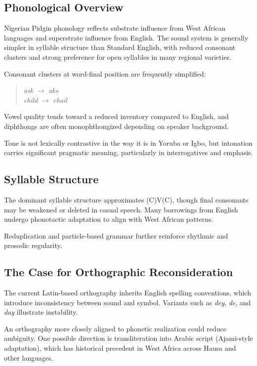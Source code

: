 \documentclass[12pt]{article}
\begin{document}
\subsection{Phonological Overview}

Nigerian Pidgin phonology reflects substrate influence from West African languages and superstrate influence from English. The sound system is generally simpler in syllable structure than Standard English, with reduced consonant clusters and strong preference for open syllables in many regional varieties.

Consonant clusters at word-final position are frequently simplified:

\begin{quote}
\textit{ask} $\rightarrow$ \textit{aks} \\
\textit{child} $\rightarrow$ \textit{chail}
\end{quote}

Vowel quality tends toward a reduced inventory compared to English, and diphthongs are often monophthongized depending on speaker background.

Tone is not lexically contrastive in the way it is in Yoruba or Igbo, but intonation carries significant pragmatic meaning, particularly in interrogatives and emphasis.

\subsection{Syllable Structure}

The dominant syllable structure approximates (C)V(C), though final consonants may be weakened or deleted in casual speech. Many borrowings from English undergo phonotactic adaptation to align with West African patterns.

Reduplication and particle-based grammar further reinforce rhythmic and prosodic regularity.

\subsection{The Case for Orthographic Reconsideration}

The current Latin-based orthography inherits English spelling conventions, which introduce inconsistency between sound and symbol. Variants such as \textit{dey}, \textit{de}, and \textit{day} illustrate instability.

An orthography more closely aligned to phonetic realization could reduce ambiguity. One possible direction is transliteration into Arabic script (Ajami-style adaptation), which has historical precedent in West Africa across Hausa and other languages.
\end{document}
